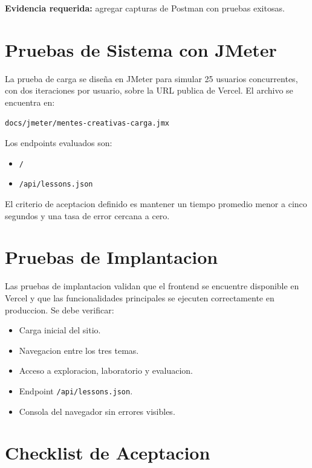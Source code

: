 \documentclass[man,12pt]{apa7}
\begin{document}
\textbf{Evidencia requerida:} agregar capturas de Postman con pruebas exitosas.

\section{Pruebas de Sistema con JMeter}

La prueba de carga se diseña en JMeter para simular 25 usuarios concurrentes, con dos iteraciones por usuario, sobre la URL publica de Vercel. El archivo se encuentra en:

\begin{lstlisting}[style=codigo]
docs/jmeter/mentes-creativas-carga.jmx
\end{lstlisting}

Los endpoints evaluados son:

\begin{itemize}
  \item \texttt{/}
  \item \texttt{/api/lessons.json}
\end{itemize}

El criterio de aceptacion definido es mantener un tiempo promedio menor a cinco segundos y una tasa de error cercana a cero.

\section{Pruebas de Implantacion}

Las pruebas de implantacion validan que el frontend se encuentre disponible en Vercel y que las funcionalidades principales se ejecuten correctamente en produccion. Se debe verificar:

\begin{itemize}
  \item Carga inicial del sitio.
  \item Navegacion entre los tres temas.
  \item Acceso a exploracion, laboratorio y evaluacion.
  \item Endpoint \texttt{/api/lessons.json}.
  \item Consola del navegador sin errores visibles.
\end{itemize}

\section{Checklist de Aceptacion}
\end{document}
